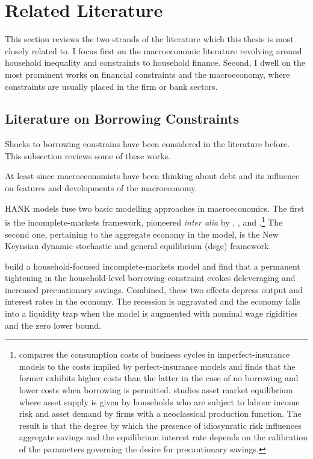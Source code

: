 \documentclass[12pt]{article} %
\numberwithin{equation}{section} %
\begin{document}
\section{Related Literature}
\label{sec:literature}

This section reviews the two strands of the literature which this thesis is most closely related to. I focus first on the macroeconomic literature revolving around household inequality and constraints to household finance. Second, I dwell on the most prominent works on financial constraints and the macroeconomy, where constraints are usually placed in the firm or bank sectors.

\subsection{Literature on Borrowing Constraints}
\label{sec:literature-borrowing}

Shocks to borrowing constrains have been considered in the literature before. This subsection reviews some of these works.

At least since \textcite{fisher1933} macroeconomists have been thinking about debt and its influence on features and developments of the macroeconomy.

HANK models fuse two basic modelling approaches in macroeconomics. The first is the incomplete-markets framework, pioneered \textit{inter alia} by \textcite{bewley1986}, \textcite{im1989}, \textcite{huggett1993} and \textcite{aiyagari1994}.\footnote{\textcite{im1989} compares the consumption costs of business cycles in imperfect-insurance models to the costs implied by perfect-insurance models and finds that the former exhibits higher costs than the latter in the case of no borrowing and lower costs when borrowing is permitted. \textcite{aiyagari1994} studies asset market equilibrium where asset supply is given by households who are subject to labour income risk and asset demand by firms with a neoclassical production function. The result is that the degree by which the presence of idiosynratic risk influences aggregate savings and the equilibrium interest rate depends on the calibration of the parameters governing the desire for precautionary savings.} The second one, pertaining to the aggregate economy in the model, is the New Keynsian dynamic stochastic and general equilibrium (\Gls{dsge}) framework.

\textcite{gl2017} build a household-focused incomplete-markets model and find that a permanent tightening in the household-level borrowing constraint evokes deleveraging and increased precuationary savings. Combined, these two effects depress output and interest rates in the economy. The recession is aggravated and the economy falls into a liquidity trap when the model is augmented with nominal wage rigidities and the zero lower bound. 
\end{document}
